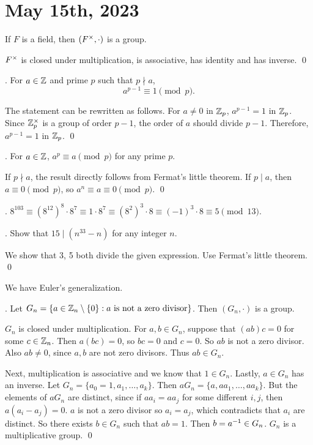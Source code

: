 \section*{May 15th, 2023}


\rmk If \(F\) is a field, then \((F^\times, \cdot)\) is a group.

\pf \(F^\times\) is closed under multiplication, is associative, has identity and has inverse. \qed

\thm.  For \(a \in \mathbb{Z}\) and prime \(p\) such that \(p \nmid a\),
\[
    a^{p-1} \equiv 1 \pmod p.
\]

\pf The statement can be rewritten as follows. For \(a \neq 0\) in \(\mathbb{Z}_p\), \(a^{p-1} = 1\) in \(\mathbb{Z}_p\). Since \(\mathbb{Z}_p^\times\) is a group of order \(p - 1\), the order of \(a\) should divide \(p - 1\). Therefore, \(a^{p - 1} = 1\) in \(\mathbb{Z}_p\). \qed

\cor. For \(a \in \mathbb{Z}\), \(a^p \equiv a \pmod p\) for any prime \(p\).

\pf If \(p \nmid a\), the result directly follows from Fermat's little theorem. If \(p \mid a\), then \(a \equiv 0 \pmod p\), so \(a^n \equiv a \equiv 0 \pmod p\). \qed

\ex. \(8^{103} \equiv (8^{12})^8 \cdot 8^7 \equiv 1 \cdot 8^7 \equiv (8^2)^3 \cdot 8 \equiv (-1)^3 \cdot 8 \equiv 5 \pmod{13}\).

\ex. Show that \(15 \mid (n^{33} - n)\) for any integer \(n\).

\pf We show that 3, 5 both divide the given expression. Use Fermat's little theorem. \qed

We have Euler's generalization.

\thm. Let \(G_n = \{a \in \mathbb{Z}_n \setminus \{0\} : a \text{ is not a zero divisor}\}\). Then \((G_n, \cdot)\) is a group.

\pf \(G_n\) is closed under multiplication. For \(a, b \in G_n\), suppose that \((ab)c = 0\) for some \(c \in \mathbb{Z}_n\). Then \(a(bc) = 0\), so \(bc = 0\) and \(c = 0\). So \(ab\) is not a zero divisor. Also \(ab \neq 0\), since \(a, b\) are not zero divisors. Thus \(ab \in G_n\).

Next, multiplication is associative and we know that \(1 \in G_n\). Lastly, \(a \in G_n\) has an inverse. Let \(G_n = \{a_0 = 1, a_1, \dots, a_k\}\). Then \(a G_n = \{a, aa_1, \dots, aa_k\}\). But the elements of \(aG_n\) are distinct, since if \(aa_i = aa_j\) for some different \(i, j\), then \(a(a_i - a_j) = 0\). \(a\) is not a zero divisor so \(a_i = a_j\), which contradicts that \(a_i\) are distinct. So there exists \(b \in G_n\) such that \(ab = 1\). Then \(b = a^{-1} \in G_n\). \(G_n\) is a multiplicative group. \qed

